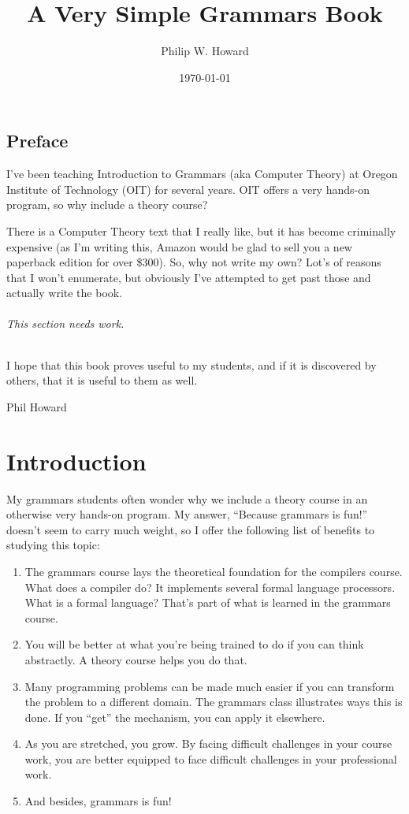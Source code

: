 \documentclass[letterpaper,12pt,openany,reqno]{book}%
\newcommand{\needswork}{\paragraph{This section needs work.}}
\begin{document}
\frontmatter
\title{A Very Simple Grammars Book}
\author{Philip W. Howard}
\date{\today}
\maketitle
\tableofcontents
\listoffigures
\chapter{Preface}
I've been teaching Introduction to Grammars (aka Computer Theory) at Oregon Institute of Technology (OIT) for several years. OIT offers a very hands-on program, so why include a theory course?

There is a Computer Theory text that I really like, but it has become criminally expensive (as I'm writing this, Amazon would be glad to sell you a new paperback edition for over \$300). So, why not write my own? Lot's of reasons that I won't enumerate, but obviously I've attempted to get past those and actually write the book. 

\needswork

I hope that this book proves useful to my students, and if it is discovered by others, that it is useful to them as well.

Phil Howard
\mainmatter
\setlength{\parindent}{0cm} %
\setlength{\parskip}{12pt plus 2pt minus 2pt}

\part{Introduction}
My grammars students often wonder why we include a theory course in an otherwise very hands-on program. My answer, ``Because grammars is fun!'' doesn't seem to carry much weight, so I offer the following list of benefits to studying this topic:

\begin{enumerate}
\item The grammars course lays the theoretical foundation for the compilers course. What does a compiler do? It implements several formal language processors. What is a formal language? That's part of what is learned in the grammars course.
\item You will be better at what you're being trained to do if you can think abstractly. A theory course helps you do that.
\item Many programming problems can be made much easier if you can transform the problem to a different domain. The grammars class illustrates ways this is done. If you ``get'' the mechanism, you can apply it elsewhere.
\item As you are stretched, you grow. By facing difficult challenges in your course work, you are better equipped to face difficult challenges in your professional work.
\item And besides, grammars is fun!
\end{enumerate}
\end{document}
